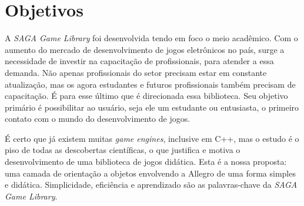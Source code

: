 \section{Objetivos}
\label{section:objetivos}
%
A \textit{SAGA Game Library} foi desenvolvida tendo em foco o meio acadêmico. Com o aumento do mercado de desenvolvimento de jogos eletrônicos no país, surge a necessidade de investir na capacitação de profissionais, para atender a essa demanda. Não apenas profissionais do setor precisam estar em constante atualização, mas os agora estudantes e futuros profissionais também precisam de capacitação. É para esse último que é direcionada essa biblioteca. Seu objetivo primário é possibilitar ao usuário, seja ele um estudante ou entusiasta, o primeiro contato com o mundo do desenvolvimento de jogos.
%
\par
%
É certo que já existem muitas \textit{game engines}, inclusive em C++, mas o estudo é o piso de todas as descobertas científicas, o que justifica e motiva o desenvolvimento de uma biblioteca de jogos didática. Esta é a nossa proposta: uma camada de orientação a objetos envolvendo a Allegro de uma forma simples e didática. Simplicidade, eficiência e aprendizado são as palavras-chave da \textit{SAGA Game Library}.
%
%
%